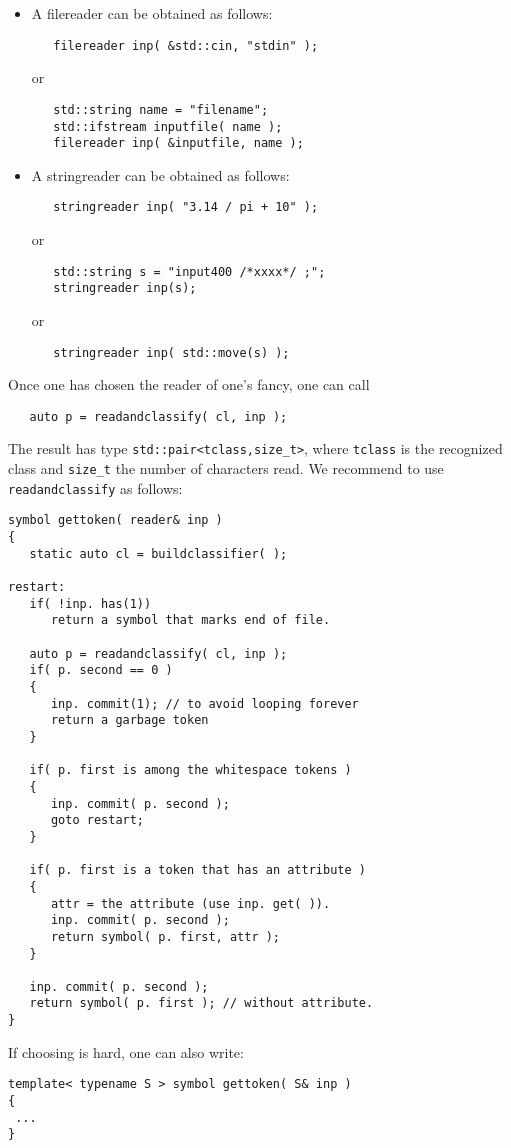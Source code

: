 \documentclass{article}
\begin{document}
\begin{itemize}
\item
   A filereader can be obtained as follows:
\begin{verbatim}
   filereader inp( &std::cin, "stdin" ); \end{verbatim}
or
\begin{verbatim}
   std::string name = "filename"; 
   std::ifstream inputfile( name ); 
   filereader inp( &inputfile, name ); \end{verbatim}
\item
   A stringreader can be obtained as follows:
\begin{verbatim}
   stringreader inp( "3.14 / pi + 10" ); \end{verbatim}
or
\begin{verbatim}
   std::string s = "input400 /*xxxx*/ ;";
   stringreader inp(s);   \end{verbatim}
or
\begin{verbatim}
   stringreader inp( std::move(s) ); \end{verbatim}
\end{itemize}

\noindent
Once one has chosen the reader of one's fancy, one can call
\begin{verbatim}
   auto p = readandclassify( cl, inp ); \end{verbatim}
The result has type \verb+std::pair<tclass,size_t>+, 
where \verb+tclass+ is the recognized class and
\verb+size_t+ the number of characters read. 
We recommend to use \verb+readandclassify+ as follows: 
\begin{verbatim}
symbol gettoken( reader& inp )
{
   static auto cl = buildclassifier( ); 
      
restart: 
   if( !inp. has(1))
      return a symbol that marks end of file.

   auto p = readandclassify( cl, inp );
   if( p. second == 0 )
   {
      inp. commit(1); // to avoid looping forever
      return a garbage token
   }

   if( p. first is among the whitespace tokens )
   {
      inp. commit( p. second ); 
      goto restart;
   }

   if( p. first is a token that has an attribute )
   {
      attr = the attribute (use inp. get( )). 
      inp. commit( p. second ); 
      return symbol( p. first, attr );
   }

   inp. commit( p. second ); 
   return symbol( p. first ); // without attribute.
} \end{verbatim}  
If choosing is hard, one can also write: 
\begin{verbatim}
template< typename S > symbol gettoken( S& inp )
{
 ...
} \end{verbatim}
\end{document}
